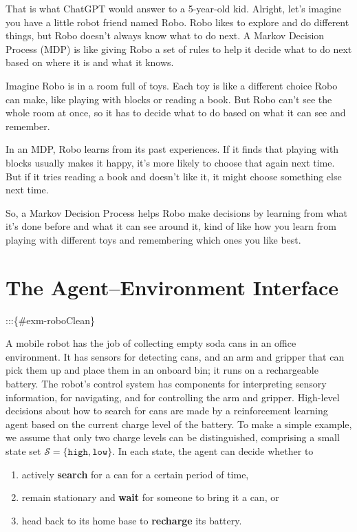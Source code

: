 \documentclass[
  letterpaper,
  DIV=11,
  numbers=noendperiod]{scrreprt}
\providecommand{\tightlist}{%
  \setlength{\itemsep}{0pt}\setlength{\parskip}{0pt}}\usepackage{longtable,booktabs,array}
\theoremstyle{definition}
\theoremstyle{remark}
\begin{document}
That is what ChatGPT would answer to a 5-year-old kid. Alright, let's
imagine you have a little robot friend named Robo. Robo likes to explore
and do different things, but Robo doesn't always know what to do next. A
Markov Decision Process (MDP) is like giving Robo a set of rules to help
it decide what to do next based on where it is and what it knows.

Imagine Robo is in a room full of toys. Each toy is like a different
choice Robo can make, like playing with blocks or reading a book. But
Robo can't see the whole room at once, so it has to decide what to do
based on what it can see and remember.

In an MDP, Robo learns from its past experiences. If it finds that
playing with blocks usually makes it happy, it's more likely to choose
that again next time. But if it tries reading a book and doesn't like
it, it might choose something else next time.

So, a Markov Decision Process helps Robo make decisions by learning from
what it's done before and what it can see around it, kind of like how
you learn from playing with different toys and remembering which ones
you like best.

\section{The Agent--Environment
Interface}\label{the-agentenvironment-interface}

:::\{\#exm-roboClean\}

A mobile robot has the job of collecting empty soda cans in an office
environment. It has sensors for detecting cans, and an arm and gripper
that can pick them up and place them in an onboard bin; it runs on a
rechargeable battery. The robot's control system has components for
interpreting sensory information, for navigating, and for controlling
the arm and gripper. High-level decisions about how to search for cans
are made by a reinforcement learning agent based on the current charge
level of the battery. To make a simple example, we assume that only two
charge levels can be distinguished, comprising a small state set
\(\mathcal{S} = \{\texttt{high}, \texttt{low} \}\). In each state, the
agent can decide whether to

\begin{enumerate}
\def\labelenumi{\arabic{enumi}.}
\tightlist
\item
  actively \textbf{search} for a can for a certain period of time,
\item
  remain stationary and \textbf{wait} for someone to bring it a can, or
\item
  head back to its home base to \textbf{recharge} its battery.
\end{enumerate}
\end{document}
